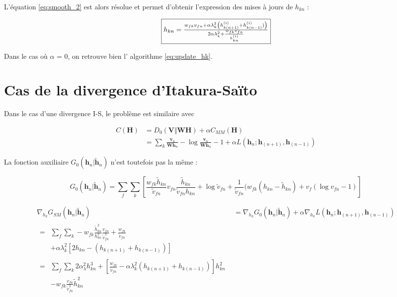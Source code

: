 L'équation \ref{eq:smooth_2} est alors résolue et permet d'obtenir l'expression des mises à jours de $h_{kn}$ : 

\begin{equation}
\fbox{$
h_{kn} = \frac{w_{fk} v_{fn}+\alpha  \lambda_k^2 \left(h_{k(n+1)}^{(i)}+h_{k(n-1)}^{(i)})\right)}{2\alpha \lambda_k^2 + \frac{w_{fk} v_{fn}} {h_{kn}^{(i)}}}$}
\end{equation}

Dans le cas où $\alpha$ = 0, on retrouve bien l' algorithme \ref{eq:update_hk}.


\section{Cas de la divergence d'Itakura-Saïto}
Dans le cas d'une divergence I-S, le problème est similaire avec

\begin{align}
C(\mathbf{H}) &= D_0(\mathbf{V} \Vert \mathbf{WH}) + \alpha C_{MM}(\mathbf{H})\\
 &= \sum_k\frac{\mathbf{v}_n}{\mathbf{Wh}_n}-\log \frac{\mathbf{v}_n}{\mathbf{Wh}_n}-1+\alpha L(\mathbf{h}_{n}; \mathbf{h}_{(n+1)}, \mathbf{h}_{(n-1)}) 
\end{align}

La fonction auxiliaire $G_0(\mathbf{h}_{n}\vert \mathbf{\tilde{h}}_{n})$ n'est toutefois pas la même : 

\begin{equation}
G_0(\mathbf{h}_n\vert \mathbf{\tilde{h}}_n) = \sum_f \sum_k \left[  \frac{w_{fk} \tilde{h}_{kn}}{\tilde{v}_{fn}}v_{fn} \frac{\tilde{h}_{kn}}{\tilde{v}_{fn} h_{kn}} + \log \tilde{v}_{fn}+ \frac{1}{\tilde{v}_{fn}}(w_{fk}(h_{kn}-\tilde{h}_{kn}) + v_f(\log v_{fn} - 1)\right]
\end{equation}

\begin{align}
\nabla_{h_{k}} G_{SM}(\mathbf{h}_n\vert \mathbf{\tilde{h}}_n) &= \nabla_{h_{k}} G_0(\mathbf{h}_n\vert \mathbf{\tilde{h}}_n) + \alpha \nabla_{h_{k}} L(\mathbf{h}_{n}; \mathbf{h}_{(n+1)}, \mathbf{h}_{(n-1)})\\
\begin{split}
=&{} \sum_f \sum_k -w_{fk}\frac{\tilde{h}_{kn}^2}{h_{kn}^2} \frac{v_{fn}}{\tilde{v}_{fn}^2}+\frac{w_{fk}}{\tilde{v}_{fn}}\\
&  + \alpha \lambda_k^2 \left[ 2 h_{kn} - \left(h_{k(n+1)}+h_{k(n-1)}\right) \right]
\end{split}\\
\begin{split}
 =&{} \sum_f \sum_k 2\alpha_\lambda^2h_{kn}^3+\left[\frac{w_{fk}}{\tilde{v}_{fn}} - \alpha \lambda_k^2\left( h_{k(n+1)}+h_{k(n-1)}\right) \right]h_{kn}^2\\
 & - w_{fk}\frac{v_{fn}}{\tilde{v}_{fn}^2}\tilde{h}_{kn}^2 
 \end{split}\label{eq:eq_mimiser_smooth}
\end{align}

